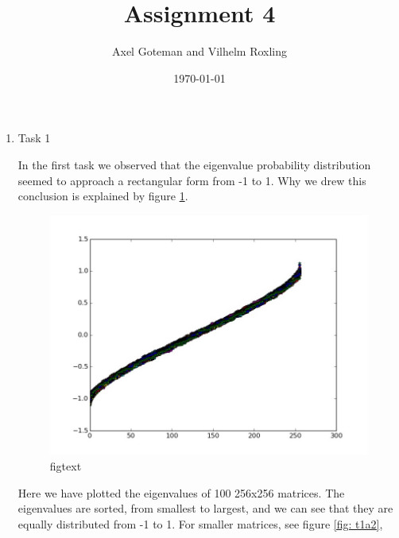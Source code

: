 \message{ !name(assignment4.tex)}\documentclass[a4paper]{article}
\title{Assignment 4}
\author{Axel Goteman and Vilhelm Roxling}
\date{\today}
\begin{document}

\maketitle

\begin{enumerate}

\item{Task 1}

In the first task we observed that the eigenvalue probability distribution seemed to approach a rectangular form from -1 to 1. Why we drew this conclusion is explained by figure \ref{fig: t1a1}.

\begin{figure}
\centering
\includegraphics[scale=0.3]{task1_a_1.jpeg}
\caption{\label{fig: t1a1}figtext}
\end{figure} 
Here we have plotted the eigenvalues of 100 256x256 matrices. The eigenvalues are sorted, from smallest to largest, and we can see that they are equally distributed from -1 to 1. For smaller matrices, see figure \ref{fig: t1a2}, 


\end{enumerate}
\end{document}
